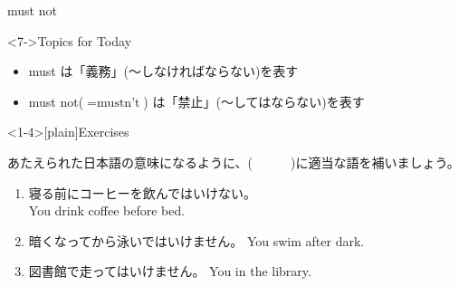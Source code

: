 \documentclass[aspectratio=169,xcolor={dvipsnames,table}]{beamer}
\begin{document}
\begin{frame}[plain]{must not}
 
\Large


\vspace{-10pt}
\mbox{}\hfill{}


\vspace{-10pt}


\vfill

\begin{exampleblock}<7->{Topics for Today}
\begin{itemize}\small
 \item must は「義務」(〜しなければならない)を表す
 \item must not($=\text{mustn't}$) は「禁止」(〜してはならない)を表す
 \end{itemize}
     \end{exampleblock}

\end{frame}


\begin{frame}<1-4>[plain]{Exercises}
 
あたえられた日本語の意味になるように、(~~~~~~)に適当な語を補いましょう。


\begin{enumerate}
 \item 寝る前にコーヒーを飲んではいけない。\\
You  drink coffee before bed.
 \item 暗くなってから泳いではいけません。 You  swim after dark.
 \item 図書館で走ってはいけません。 You   in the library.
\end{enumerate}
\end{frame}
\end{document}
